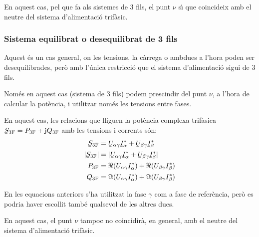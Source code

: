 En aquest cas, pel que fa als sistemes de 3 fils,  el punt $\nu$ s\'{\i}
que coincideix amb el neutre del sistema d'alimentaci\'{o} trif\`{a}sic.

\subsubsection{Sistema equilibrat o desequilibrat de 3 fils}

Aquest \'{e}s un cas  general, on les tensions, la c\`{a}rrega o ambdues a
l'hora  poden ser desequilibrades, per\`{o} amb l'\'{u}nica restricci\'{o} que
el sistema d'alimentaci\'{o} sigui de 3 fils.

 Nom\'{e}s en aquest cas (sistema de 3 fils) podem prescindir del punt $\nu$, a l'hora de
calcular la pot\`{e}ncia, i utilitzar nom\'{e}s les tensions entre fases.

En aquest cas, les relacions que lliguen la pot\`{e}ncia complexa
trif\`{a}sica $\cmplx{S}\ped{3F} = P\ped{3F} + \ju Q\ped{3F}$ amb les
tensions i corrents s\'{o}n:
\begin{align}
    \cmplx{S}\ped{3F} &= \cmplx{U}_{\alpha\gamma} \cmplx{I}_\alpha^*
     +  \cmplx{U}_{\beta\gamma} \cmplx{I}_\beta^*  \label{eq:s_3f_3fils}\\
    |\cmplx{S}\ped{3F}| &= |\cmplx{U}_{\alpha\gamma} \cmplx{I}_\alpha^* +
    \cmplx{U}_{\beta\gamma} \cmplx{I}_\beta^*| \\
    P\ped{3F} &= \Re(\cmplx{U}_{\alpha\gamma} \cmplx{I}_\alpha^*) +
    \Re(\cmplx{U}_{\beta\gamma} \cmplx{I}_\beta^*) \\
    Q\ped{3F} &= \Im(\cmplx{U}_{\alpha\gamma} \cmplx{I}_\alpha^*) +
    \Im(\cmplx{U}_{\beta\gamma} \cmplx{I}_\beta^*)
\end{align}

En les equacions anteriors s'ha utilitzat la fase $\gamma$ com a
fase de refer\`{e}ncia, per\`{o} es podria haver escollit tamb\'{e} qualsevol de
les altres dues.

En aquest cas, el punt $\nu$ tampoc no coincidir\`{a}, en general, amb
el neutre del sistema d'alimentaci\'{o} trif\`{a}sic.

